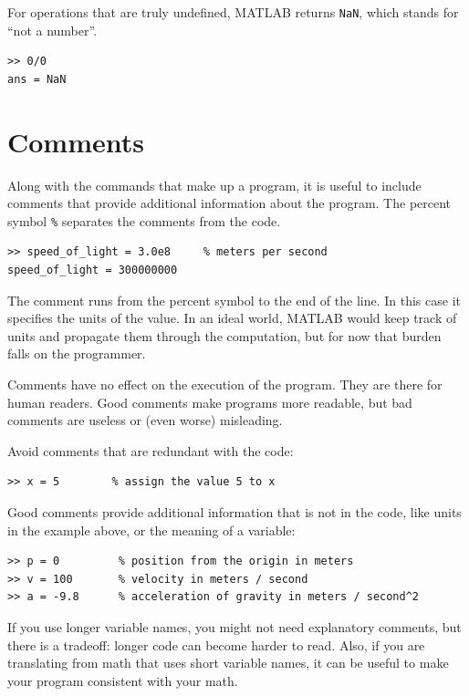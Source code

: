\documentclass{book}
\begin{document}
For operations that are truly undefined, MATLAB returns {\tt NaN},
which stands for ``not a number''.

\begin{verbatim}
>> 0/0
ans = NaN
\end{verbatim}



\section{Comments}

Along with the commands that make up a program, it is useful
to include comments that provide additional information about the
program.  The percent symbol {\tt \%} separates
the comments from the code.

\begin{verbatim}
>> speed_of_light = 3.0e8     % meters per second
speed_of_light = 300000000
\end{verbatim}

The comment runs from the percent symbol to the end of the line.
In this case it specifies the units of the value.  In an ideal world,
MATLAB would keep track of units and propagate them through the
computation, but for now that burden falls on the programmer.

Comments have no effect on the execution of the program.  They
are there for human readers.  Good comments make programs more
readable, but bad comments are useless or (even worse) misleading.

Avoid comments that are redundant with the code:

\begin{verbatim}
>> x = 5        % assign the value 5 to x
\end{verbatim}

Good comments provide additional information that is not in the
code, like units in the example above, or the meaning of a variable:

\begin{verbatim}
>> p = 0         % position from the origin in meters 
>> v = 100       % velocity in meters / second
>> a = -9.8      % acceleration of gravity in meters / second^2
\end{verbatim}

If you use longer variable names, you might not need explanatory
comments, but there is a tradeoff: longer code can become harder
to read.  Also, if you are translating from math
that uses short variable names, it can be useful to make your
program consistent with your math. 
\end{document}
